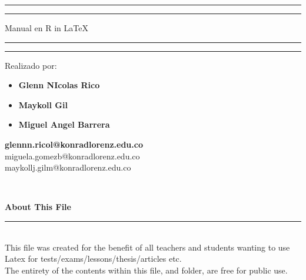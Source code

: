 \documentclass[12pt,hidelinks]{article}
\begin{document}
\begin{titlepage}
	\centering %
	\scshape %
	\vspace*{1.5\baselineskip} %

	\rule{13cm}{1.6pt}\vspace*{-\baselineskip}\vspace*{2pt} %
	\rule{13cm}{0.4pt} %
	
		\vspace{0.75\baselineskip} %
	{	\Huge Manual en R in \LaTeX \\	}
		\vspace{0.75\baselineskip} %
	\rule{13cm}{0.4pt}\vspace*{-\baselineskip}\vspace{3.2pt} %
	\rule{13cm}{1.6pt} %
	
		\vspace{1.75\baselineskip} %
	{\large Realizado por: \begin{itemize}
	    \item \textbf{Glenn NIcolas Rico} 
	    \item \textbf{Maykoll Gil}
	    \item \textbf{Miguel Angel Barrera }
	\end{itemize}
		\vspace*{1.2\baselineskip}
	\textbf{glennn.ricol@konradlorenz.edu.co} \vspace{2mm}\\
	miguela.gomezb@konradlorenz.edu.co \vspace{2mm}\\
	maykollj.gilm@konradlorenz.edu.co} \\
	\vfill

\end{titlepage}
\tableofcontents
\vfill
\small{\noindent \textbf{About This File} \vspace{-3mm}\\
\noindent \rule{3.3cm}{0.5pt} \\
This file was created for the benefit of all teachers and students wanting to use Latex for tests/exams/lessons/thesis/articles etc.\\
The entirety of the contents within this file, and folder, are free for public use.}
\newpage
{}
\end{document}

